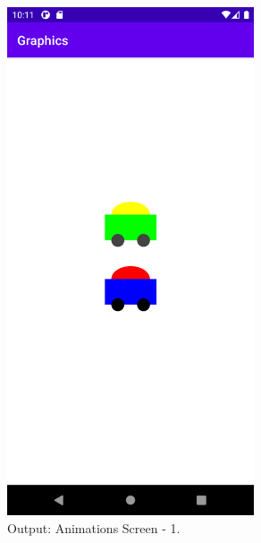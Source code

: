 \documentclass[12pt, a4]{article}
\begin{document}
\subsection*{}
\begin{figure}[h]
\centering
\caption{Output: Animations Screen - 1.}
\includegraphics[height=15cm, width=7.3cm]{Graphics/Screenshots/Graphics-3.png}
\end{figure}

\newpage
\end{document}
